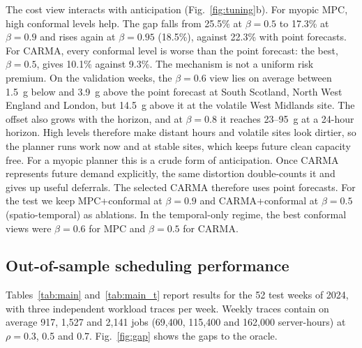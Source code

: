 The cost view interacts with anticipation (Fig.~\ref{fig:tuning}b). For myopic MPC, high conformal levels help. The gap falls from 25.5\% at $\beta=0.5$ to 17.3\% at $\beta=0.9$ and rises again at $\beta=0.95$ (18.5\%), against 22.3\% with point forecasts. For CARMA, every conformal level is worse than the point forecast: the best, $\beta=0.5$, gives 10.1\% against 9.3\%. The mechanism is not a uniform risk premium. On the validation weeks, the $\beta=0.6$ view lies on average between 1.5~g below and 3.9~g above the point forecast at South Scotland, North West England and London, but 14.5~g above it at the volatile West Midlands site. The offset also grows with the horizon, and at $\beta=0.8$ it reaches 23--95~g at a 24-hour horizon. High levels therefore make distant hours and volatile sites look dirtier, so the planner runs work now and at stable sites, which keeps future clean capacity free. For a myopic planner this is a crude form of anticipation. Once CARMA represents future demand explicitly, the same distortion double-counts it and gives up useful deferrals. The selected CARMA therefore uses point forecasts. For the test we keep MPC+conformal at $\beta=0.9$ and CARMA+conformal at $\beta=0.5$ (spatio-temporal) as ablations. In the temporal-only regime, the best conformal views were $\beta=0.6$ for MPC and $\beta=0.5$ for CARMA.

\FloatBarrier
\subsection{Out-of-sample scheduling performance}\label{sec:res_main}

Tables~\ref{tab:main} and~\ref{tab:main_t} report results for the 52 test weeks of 2024, with three independent workload traces per week. Weekly traces contain on average 917, 1{,}527 and 2{,}141 jobs (69{,}400, 115{,}400 and 162{,}000 server-hours) at $\rho=0.3$, 0.5 and 0.7. Fig.~\ref{fig:gap} shows the gaps to the oracle.

